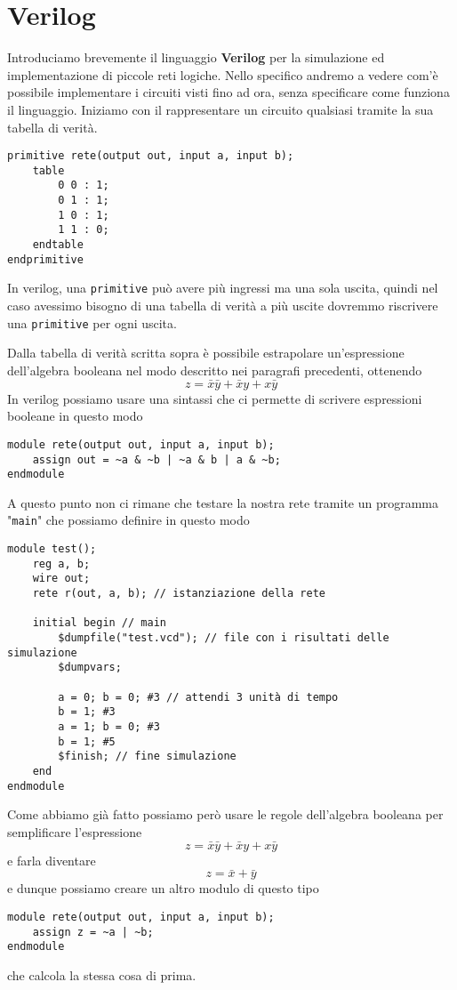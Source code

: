 \section{Verilog}
Introduciamo brevemente il linguaggio \textbf{Verilog} per la simulazione ed implementazione di
piccole reti logiche. Nello specifico andremo a vedere com'è possibile implementare i circuiti
visti fino ad ora, senza specificare come funziona il linguaggio. Iniziamo con il rappresentare un
circuito qualsiasi tramite la sua tabella di verità.
\begin{verbatim}
primitive rete(output out, input a, input b);
	table
		0 0 : 1;
		0 1 : 1;
		1 0 : 1;
		1 1 : 0;
	endtable
endprimitive
\end{verbatim}
In verilog, una \verb|primitive| può avere più ingressi ma una sola uscita, quindi nel caso
avessimo bisogno di una tabella di verità a più uscite dovremmo riscrivere una \verb|primitive| per
ogni uscita.

Dalla tabella di verità scritta sopra è possibile estrapolare un'espressione dell'algebra booleana
nel modo descritto nei paragrafi precedenti, ottenendo
\[ z = \bar{x} \bar{y} + \bar{x} y + x \bar{y} \]
In verilog possiamo usare una sintassi che ci permette di scrivere espressioni booleane in questo
modo
\begin{verbatim}
module rete(output out, input a, input b);
	assign out = ~a & ~b | ~a & b | a & ~b;
endmodule
\end{verbatim}
A questo punto non ci rimane che testare la nostra rete tramite un programma "\verb|main|" che
possiamo definire in questo modo
\begin{verbatim}
module test();
	reg a, b;
	wire out;
	rete r(out, a, b); // istanziazione della rete 
	
	initial begin // main
		$dumpfile("test.vcd"); // file con i risultati delle simulazione
		$dumpvars;

		a = 0; b = 0; #3 // attendi 3 unità di tempo
		b = 1; #3
		a = 1; b = 0; #3
		b = 1; #5
		$finish; // fine simulazione
	end
endmodule
\end{verbatim}
Come abbiamo già fatto possiamo però usare le regole dell'algebra booleana per semplificare
l'espressione
\[ z = \bar{x} \bar{y} + \bar{x} y + x \bar{y} \]
e farla diventare
\[ z = \bar{x} + \bar{y} \]
e dunque possiamo creare un altro modulo di questo tipo
\begin{verbatim}
module rete(output out, input a, input b);
	assign z = ~a | ~b;
endmodule
\end{verbatim}
che calcola la stessa cosa di prima.

